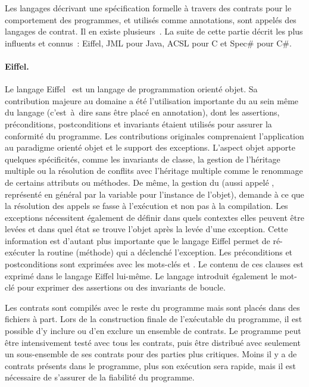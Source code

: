 Les langages décrivant une spécification formelle à travers des contrats pour le
comportement des programmes, et utilisés comme annotations, sont appelés des
{\strong langages de contrat}. Il en existe plusieurs~.
La suite de cette partie décrit les plus influents et connus~: Eiffel, JML pour
Java, ACSL pour C et Spec\# pour C\#.

\paragraph{Eiffel.} Le langage Eiffel~ est un langage de
programmation orienté objet. Sa contribution majeure au domaine a été
l'utilisation importante du  au sein même du
langage (c'est~à~dire sans être placé en annotation), dont les assertions,
préconditions, postconditions et invariants étaient utilisés pour assurer la
conformité du programme. Les contributions originales comprenaient l'application
au paradigme orienté objet et le support des exceptions. L'aspect objet apporte
quelques spécificités, comme les invariants de classe, la gestion de l'héritage
multiple ou la résolution de conflits avec l'héritage multiple comme le
renommage de certains attributs ou méthodes. De même, la gestion du
 (aussi appelé , représenté
en général par la variable  pour l'instance de l'objet), demande à ce
que la résolution des appels se fasse à l'exécution et non pas à la compilation.
Les exceptions nécessitent également de définir dans quels contextes elles
peuvent être levées et dans quel état se trouve l'objet après la levée d'une
exception. Cette information est d'autant plus importante que le langage Eiffel
permet de ré-exécuter la routine (méthode) qui a déclenché l'exception. Les
préconditions et postconditions sont exprimées avec les mots-clés 
et . Le contenu de ces clauses est exprimé dans le langage Eiffel
lui-même. Le langage introduit également le mot-clé  pour exprimer
des assertions ou des invariants de boucle.

Les contrats sont compilés avec le reste du programme mais sont placés dans des
fichiers à part. Lors de la construction finale de l'exécutable du programme, il
est possible d'y inclure ou d'en exclure un ensemble de contrats. Le programme
peut être intensivement testé avec tous les contrats, puis être distribué avec
seulement un sous-ensemble de ses contrats pour des parties plus critiques.
Moins il y a de contrats présents dans le programme, plus son exécution sera
rapide, mais il est nécessaire de s'assurer de la fiabilité du programme.

